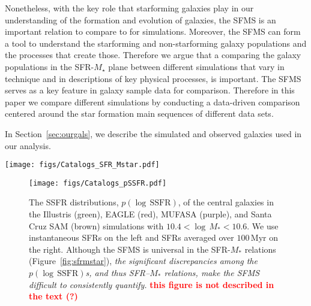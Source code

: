 \documentclass[preprint2,tighten]{aastex62}
\newcommand{\todo}[1]{{\bf \textcolor{red}{ #1}}}
\begin{document}
Nonetheless, with the key role that starforming galaxies play in our understanding of the formation and evolution of galaxies, the SFMS is an important relation to compare to for simulations. Moreover, the SFMS can form a tool to understand the starforming and non-starforming galaxy populations and the processes that create those. Therefore we argue that a comparing the galaxy populations in the SFR-$M_{\star}$ plane between different simulations that vary in technique and in descriptions of key physical processes, is important. The SFMS serves as a key feature in galaxy sample data for comparison. Therefore in this paper we compare different simulations by conducting a data-driven comparison centered around the star formation main 
sequences of different data sets. 

In Section~\ref{sec:ourgals}, we describe the simulated and observed galaxies 
used in our analysis. 


\begin{figure*}
\begin{center}
\texttt{[image: figs/Catalogs\_SFR\_Mstar.pdf]} 
\caption{The SFR--$M_*$ relations of central galaxies from the Illustris, 
EAGLE, MUFASA, and Santa Cruz SAM simulations (left to right). The 
top panels use instantaneous SFRs while the bottom panels use SFRs 
averaged over $100\,\mathrm{Myr}$. The simulations and how they derive 
the SFRs are described in Section~\ref{sec:galsims}. Although a
direct comparison to observations is tenuous due to the fact that 
the SFRs and $M_*$s of the observed SDSS galaxies are \emph{not} 
derived consistently as simulations, we include, for reference, the 
observed  SDSS galaxies (Section~\ref{sec:obvs}) on the right. 
\emph{The $\mathrm{SFR}--M_*$ relations in every panel reveals a 
clear star forming main sequence.}} 
\label{fig:sfrmstar}
\end{center}
\end{figure*}

\begin{figure}
\begin{center}
\texttt{[image: figs/Catalogs\_pSSFR.pdf]} 
\caption{The SSFR distributions, $p(\log\,\mathrm{SSFR})$, of the 
central galaxies in the Illustris (green), 
EAGLE (red),  MUFASA (purple), and  Santa Cruz SAM (brown) simulations 
with $10.4 < \log\,M_* < 10.6$. We use instantaneous SFRs on the left
and SFRs averaged over $100\,\mathrm{Myr}$ on the right. Although the
SFMS is universal in the SFR-$M_*$ relations (Figure~\ref{fig:sfrmstar}), 
\emph{the significant discrepancies among the $p(\log\,\mathrm{SSFR})$s,
and thus SFR--$M_*$ relations, make the SFMS difficult to consistently 
quantify.} \todo{this figure is not described in the text (?)}} \label{fig:pssfr}
\end{center}
\end{figure}
\end{document}
